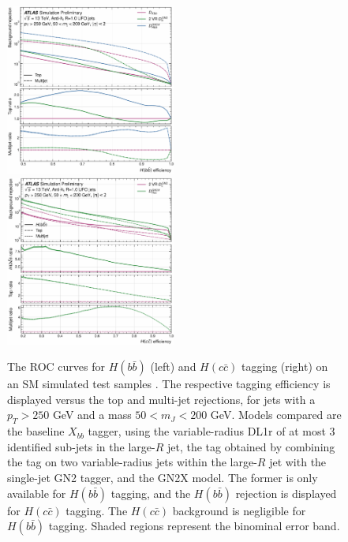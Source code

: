 \begin{center}
  \begin{figure}[h!]
  \centerline{
  \includegraphics[width=0.50\textwidth]{Images/FTAG/GN2X/roc/rocHbb.pdf}
  \includegraphics[width=0.50\textwidth]{Images/FTAG/GN2X/roc/rocHcc.pdf}
  }
  \caption{The ROC curves for $H(b\bar{b})$ (left) and $H(c\bar{c})$ tagging (right) on an SM simulated test samples \cite{ATL-PHYS-PUB-2023-021}. The respective tagging efficiency is displayed versus the top and multi-jet rejections, for jets with a $p_T > 250$ GeV and a mass $50 < m_J < 200$ GeV. Models compared are the baseline $X_{bb}$ tagger, using the variable-radius DL1r of at most 3 identified sub-jets in the large-$R$ jet, the tag obtained by combining the tag on two variable-radius jets within the large-$R$ jet with the single-jet GN2 tagger, and the GN2X model. The former is only available for $H(b\bar{b})$ tagging, and the $H(b\bar{b})$ rejection is displayed for $H(c\bar{c})$ tagging. The $H(c\bar{c})$ background is negligible for $H(b\bar{b})$ tagging. Shaded regions represent the binominal error band.}
  \label{fig:rocGN2X}
  \end{figure}
\end{center}